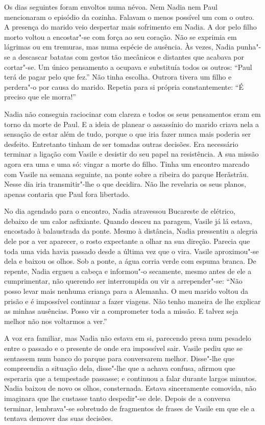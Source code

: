 Os dias seguintes foram envoltos numa névoa. Nem Nadia nem Paul
mencionaram o episódio da cozinha. Falavam o menos possível um com o
outro. A presença do marido veio despertar mais sofrimento em Nadia. A
dor pelo filho morto voltou a encostar"-se com força ao seu coração. Não
se exprimia em lágrimas ou em tremuras, mas numa espécie de ausência. Às
vezes, Nadia punha"-se a descascar batatas com gestos tão mecânicos e
distantes que acabava por cortar"-se. Um único pensamento a ocupava e
substituía todos os outros: ``Paul terá de pagar pelo que fez.'' Não tinha
escolha. Outrora tivera um filho e perdera"-o por causa do marido.
Repetia para si própria constantemente: ``É preciso que ele morra!''

Nadia não conseguia raciocinar com clareza e todos os seus pensamentos
eram em torno da morte de Paul. E a ideia de planear o assassínio do
marido criava nela a sensação de estar além de tudo, porque o que iria
fazer nunca mais poderia ser desfeito. Entretanto tinham de ser tomadas outras decisões. Era necessário terminar a ligação com Vasile e
desistir do seu papel na resistência. A sua missão agora era uma e uma
só: vingar a morte do filho. Tinha um encontro marcado com Vasile na
semana seguinte, na ponte sobre a ribeira do parque Herǎstrǎu. Nesse
dia iria transmitir"-lhe o que decidira. Não lhe revelaria os seus
planos, apenas contaria que Paul fora libertado.

\bigskip

No dia agendado para o encontro, Nadia atravessou Bucareste de
elétrico, debaixo de um calor asfixiante. Quando desceu na paragem,
Vasile já lá estava, encostado à balaustrada da ponte. Mesmo à
distância, Nadia pressentiu a alegria dele por a ver aparecer, o rosto expectante a olhar na sua direção. Parecia que toda uma vida havia passado desde a última vez
que o vira. Vasile aproximou"-se dela e baixou os olhos. Sob a ponte, a
água corria verde com espuma branca. De repente, Nadia ergueu a cabeça e
informou"-o secamente, mesmo antes de ele a cumprimentar, não querendo
ser interrompida ou vir a arrepender"-se:
``Não posso levar mais nenhuma criança para a Alemanha. O meu marido
voltou da prisão e é impossível continuar a fazer viagens. Não tenho
maneira de lhe explicar as minhas ausências. Posso vir a comprometer
toda a missão. E talvez seja melhor não nos voltarmos a ver.''

A voz era familiar, mas Nadia não estava em si, parecendo presa num
pesadelo entre o passado e o presente de onde era impossível sair.
Vasile pediu que se sentassem num banco do parque para conversarem
melhor. Disse"-lhe que compreendia a situação dela, disse"-lhe que a
achava confusa, afirmou que esperaria que a tempestade passasse; e
continuou a falar durante largos minutos. Nadia baixou de novo os olhos,
consternada. Estava sinceramente comovida, não imaginara que lhe
custasse tanto despedir"-se dele. Depois de a conversa terminar,
lembrava"-se sobretudo de fragmentos de frases de Vasile em que ele a
tentava demover das suas decisões.

